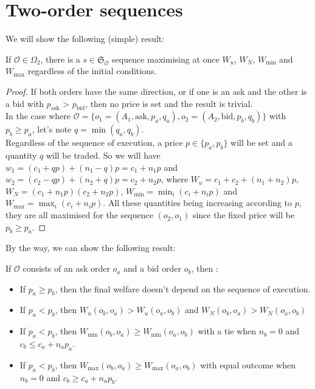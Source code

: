 \documentclass[a4paper]{article}
\newcommand{\Sg}{\mathfrak{S}}
\newcommand{\Oc}{\mathcal{O}}
\newtheorem[style=S, bodystyle=\noindent]{thm}{Theorem}[section]
\newtheorem[style=S, bodystyle=\noindent]{defn}[thm]{Definition}
\newtheorem[style=S, bodystyle=\noindent]{propo}[thm]{Proposition}
\newtheorem[style=S, bodystyle=\noindent]{prop}[thm]{Property}
\newtheorem[style=S, bodystyle=\noindent]{coro}[thm]{Corollary}
\newtheorem[style=S, bodystyle=\noindent]{lem}[thm]{Lemma}
\newtheorem[style=S, headstyle=\bfseries\boldmath Theorem, bodystyle=\noindent]{thm*}{Theorem}
\newtheorem[style=S, headstyle=\bfseries\boldmath Definition, bodystyle=\noindent]{defn*}{Definition}
\newtheorem[style=S, headstyle=\bfseries\boldmath Proposition, bodystyle=\noindent]{propo*}{Proposition}
\newtheorem[style=S, headstyle=\bfseries\boldmath Property, bodystyle=\noindent]{prop*}{Property}
\newtheorem[style=S, headstyle=\bfseries\boldmath Corollary, bodystyle=\noindent]{coro*}{Corollary}
\newtheorem[style=S, headstyle=\bfseries\boldmath Lemma, bodystyle=\noindent]{lem*}{Lemma}
\begin{document}
\section{Two-order sequences}


We will show the following (simple) result:
\begin{prop}
If $\Oc \in \Omega_2$, there is a $s \in \Sg_{\mathcal O}$ sequence maximising at once $W_u$, $W_N$, $W_{\min}$ and $W_{\max}$ regardless of the initial conditions.
\end{prop}

\begin{proof}
If both orders have the same direction, or if one is an ask and the other is a bid with $p_\text{ask}$ > $p_\text{bid}$, then no price is set and the result is trivial. \\
In the case where $\mathcal O = \{o_1 = (A_1, \text{ask}, p_a, q_a), o_2 = (A_2, \text{bid}, p_b, q_b)\}$ with $p_b \geq p_a$, let's note $q = \min(q_a,q_b)$. \\
Regardless of the sequence of execution, a price $p\in\{p_a,p_b\}$ will be set and a quantity $q$ will be traded. So we will have $w_1 = (c_1 + qp) + (n_1-q)p = c_1+n_1p$ and $w_2 = (c_2 - qp) + (n_2+q)p = c_2+n_2p$, where $W_u = c_1+c_2+(n_1+n_2)p$, $W_N = (c_1+n_1p)(c_2+n_2p)$, $W_{\min} = \min_i(c_i + n_ip)$ and $W_{\max} = \max_i(c_i + n_ip)$. All these quantities being increasing according to $p$, they are all maximised for the sequence $(o_2, o_1)$ since the fixed price will be $p_b \geq p_a$.
\end{proof}

By the way, we can show the following result:
\begin{prop}
\label{prop1}
If $\mathcal O$ consists of an ask order $o_a$ and a bid order $o_b$, then :
\begin{itemize}
	\item If $p_a \geq p_b$, then the final welfare doesn't depend on the sequence of execution.
	\item If $p_a < p_b$, then $W_u(o_b,o_a) > W_u(o_a,o_b)$ and $W_N(o_b,o_a) > W_N(o_a,o_b)$
	\item If $p_a < p_b$, then $W_{\min}(o_b,o_a) \geq W_{\min}(o_a,o_b)$ with a tie when $n_b = 0$ and $c_b \leq c_a + n_ap_a$.
	\item If $p_a < p_b$, then $W_{\max}(o_b,o_a) \geq W_{\max}(o_a,o_b)$ with equal outcome when $n_b = 0$ and $c_b \geq c_a + n_ap_b$.
\end{itemize}
\end{prop}
\end{document}
